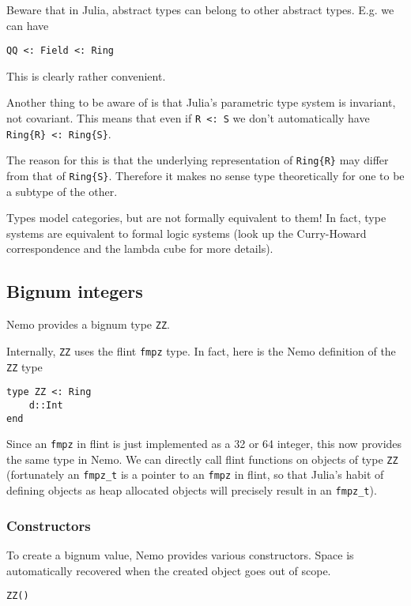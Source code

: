 \documentclass[a4paper,10pt]{article}
\newcommand{\code}{\lstinline}
\begin{document}
{Beware that in Julia, abstract types can belong to other abstract types. E.g. we
can have

\begin{lstlisting}
QQ <: Field <: Ring
\end{lstlisting}

This is clearly rather convenient.

Another thing to be aware of is that Julia's parametric type system is invariant,
not covariant. This means that even if \code{R <: S} we don't automatically have
\code|Ring{R} <: Ring{S}|.

The reason for this is that the underlying representation of \code|Ring{R}| may
differ from that of \code|Ring{S}|. Therefore it makes no sense type theoretically
for one to be a subtype of the other.

Types model categories, but are not formally equivalent to them! In fact, type
systems are equivalent to formal logic systems (look up the Curry-Howard
correspondence and the lambda cube for more details).

\subsection{Bignum integers}

Nemo provides a bignum type \code{ZZ}.

Internally, \code{ZZ} uses the flint \code{fmpz} type. In fact, here is the Nemo
definition of the \code{ZZ} type

\begin{lstlisting}
type ZZ <: Ring
    d::Int
end
\end{lstlisting}

Since an \code{fmpz} in flint is just implemented as a 32 or 64 integer, this now 
provides the same type in Nemo. We can directly call flint functions on objects of
type \code{ZZ} (fortunately an \code{fmpz_t} is a pointer to an \code{fmpz} in 
flint, so that Julia's habit of defining objects as heap allocated objects will 
precisely result in an \code{fmpz_t}).

\subsubsection{Constructors}

To create a bignum value, Nemo provides various constructors. Space is automatically
recovered when the created object goes out of scope.

\begin{lstlisting}
ZZ()
\end{lstlisting}

}
\end{document}
